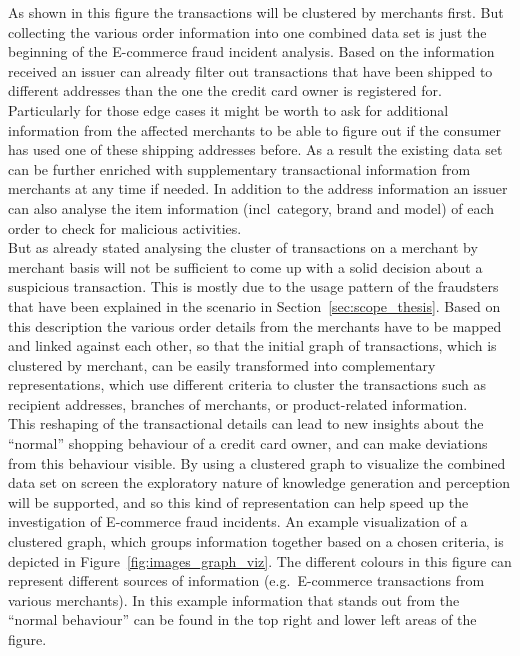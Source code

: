 As shown in this figure the transactions will be clustered by merchants first. But collecting the various order information into one combined data set is just the beginning of the \gls{E-commerce} fraud incident analysis. Based on the information received an issuer can already filter out transactions that have been shipped to different addresses than the one the credit card owner is registered for. Particularly for those edge cases it might be worth to ask for additional information from the affected merchants to be able to figure out if the consumer has used one of these shipping addresses before. As a result the existing data set can be further enriched with supplementary transactional information from merchants at any time if needed. In addition to the address information an issuer can also analyse the item information (\gls{incl}\ category, brand and model) of each order to check for malicious activities. \\

But as already stated analysing the cluster of transactions on a merchant by merchant basis will not be sufficient to come up with a solid decision about a suspicious transaction. This is mostly due to the usage pattern of the fraudsters that have been explained in the scenario in Section~\ref{sec:scope_thesis}. Based on this description the various order details from the merchants have to be mapped and linked against each other, so that the initial graph of transactions, which is clustered by merchant, can be easily transformed into complementary representations, which use different criteria to cluster the transactions such as recipient addresses, branches of merchants, or product-related information. \\

This reshaping of the transactional details can lead to new insights about the ``normal'' shopping behaviour of a credit card owner, and can make deviations from this behaviour visible. By using a clustered graph to visualize the combined data set on screen the exploratory nature of knowledge generation and perception will be supported, and so this kind of representation can help speed up the investigation of \gls{E-commerce} fraud incidents. An example visualization of a clustered graph, which groups information together based on a chosen criteria, is depicted in Figure~\ref{fig:images_graph_viz}. The different colours in this figure can represent different sources of information (e.g.\ \gls{E-commerce} transactions from various merchants). In this example information that stands out from the ``normal behaviour'' can be found in the top right and lower left areas of the figure. \@

